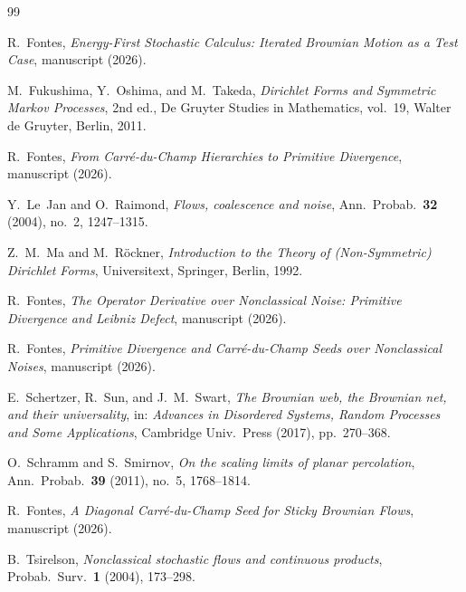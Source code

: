 \documentclass[11pt,reqno]{amsart}
\theoremstyle{plain}
\theoremstyle{definition}
\theoremstyle{remark}
\begin{document}
\begin{thebibliography}{99}

R.~Fontes, \emph{Energy-First Stochastic Calculus: Iterated Brownian
  Motion as a Test Case}, manuscript (2026).

M.~Fukushima, Y.~Oshima, and M.~Takeda, \emph{Dirichlet Forms and
  Symmetric Markov Processes}, 2nd ed., De Gruyter Studies in
  Mathematics, vol.~19, Walter de Gruyter, Berlin, 2011.

R.~Fontes, \emph{From Carr\'e-du-Champ Hierarchies to Primitive
  Divergence}, manuscript (2026).

Y.~Le~Jan and O.~Raimond, \emph{Flows, coalescence and noise},
  Ann.~Probab.~\textbf{32} (2004), no.~2, 1247--1315.

Z.~M.~Ma and M.~R\"ockner, \emph{Introduction to the Theory of
  (Non-Symmetric) Dirichlet Forms}, Universitext, Springer,
  Berlin, 1992.

R.~Fontes, \emph{The Operator Derivative over Nonclassical Noise:
  Primitive Divergence and Leibniz Defect}, manuscript (2026).

R.~Fontes, \emph{Primitive Divergence and Carr\'e-du-Champ Seeds
  over Nonclassical Noises}, manuscript (2026).

E.~Schertzer, R.~Sun, and J.~M.~Swart, \emph{The Brownian web,
  the Brownian net, and their universality}, in: \emph{Advances in
  Disordered Systems, Random Processes and Some Applications},
  Cambridge Univ.\ Press (2017), pp.~270--368.

O.~Schramm and S.~Smirnov, \emph{On the scaling limits of planar
  percolation}, Ann.~Probab.~\textbf{39} (2011), no.~5, 1768--1814.

R.~Fontes, \emph{A Diagonal Carr\'e-du-Champ Seed for Sticky
  Brownian Flows}, manuscript (2026).

B.~Tsirelson, \emph{Nonclassical stochastic flows and continuous
  products}, Probab.~Surv.~\textbf{1} (2004), 173--298.

\end{thebibliography}
\end{document}
